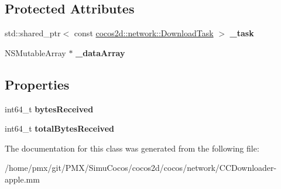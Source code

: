 \subsection*{Protected Attributes}
\begin{DoxyCompactItemize}
\item 
\mbox{\label{interfaceDownloadTaskWrapper_af6a0cf08bfebc4258b5fdd07a529b5a7}} 
std\+::shared\+\_\+ptr$<$ const \hyperlink{classcocos2d_1_1network_1_1DownloadTask}{cocos2d\+::network\+::\+Download\+Task} $>$ {\bfseries \+\_\+task}
\item 
\mbox{\label{interfaceDownloadTaskWrapper_adfbba4c4398a382da4c169fa8165b58a}} 
N\+S\+Mutable\+Array $\ast$ {\bfseries \+\_\+data\+Array}
\end{DoxyCompactItemize}
\subsection*{Properties}
\begin{DoxyCompactItemize}
\item 
\mbox{\label{interfaceDownloadTaskWrapper_aecc75578d4ac96a24479d99177467c4f}} 
int64\+\_\+t {\bfseries bytes\+Received}
\item 
\mbox{\label{interfaceDownloadTaskWrapper_a3bcddbe17296caf94256f186da6222d6}} 
int64\+\_\+t {\bfseries total\+Bytes\+Received}
\end{DoxyCompactItemize}


The documentation for this class was generated from the following file\+:\begin{DoxyCompactItemize}
\item 
/home/pmx/git/\+P\+M\+X/\+Simu\+Cocos/cocos2d/cocos/network/C\+C\+Downloader-\/apple.\+mm\end{DoxyCompactItemize}
